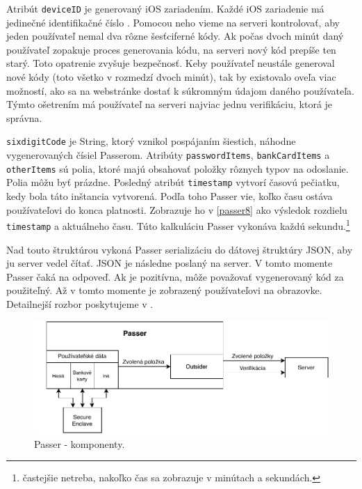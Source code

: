 Atribút \texttt{deviceID} je generovaný iOS zariadením. Každé iOS zariadenie má jedinečné identifikačné číslo \cite{iOS_id}. Pomocou neho vieme na serveri kontrolovať, aby jeden používateľ nemal dva rôzne šesťciferné kódy. Ak počas dvoch minút daný používateľ zopakuje proces generovania kódu, na serveri nový kód prepíše ten starý. Toto opatrenie zvyšuje bezpečnosť. Keby používateľ neustále generoval nové kódy (toto všetko v rozmedzí dvoch minút), tak by existovalo oveľa viac možností, ako sa na webstránke dostať k súkromným údajom daného používateľa. Týmto ošetrením má používateľ na serveri najviac jednu verifikáciu, ktorá je správna.

\texttt{sixdigitCode} je String, ktorý vznikol pospájaním šiestich, náhodne vygenerovaných čísiel Passerom. Atribúty \texttt{passwordItems}, \texttt{bankCardItems} a \texttt{otherItems} sú polia, ktoré majú obsahovať položky rôznych typov na odoslanie. Polia môžu byť prázdne. Posledný atribút \texttt{timestamp} vytvorí časovú pečiatku, kedy bola táto inštancia vytvorená. Podľa toho Passer vie, koľko času ostáva používateľovi do konca platnosti. Zobrazuje ho v \figurename{ \ref{passer8}} ako výsledok rozdielu \texttt{timestamp} a aktuálneho času. Túto kalkuláciu Passer vykonáva každú sekundu.\footnote{častejšie netreba, nakoľko čas sa zobrazuje v minútach a sekundách.}

Nad touto štruktúrou vykoná Passer serializáciu do dátovej štruktúry JSON, aby ju server vedel čítať. JSON je následne poslaný na server. V tomto momente Passer čaká na odpoveď. Ak je pozitívna, môže považovať vygenerovaný kód za použiteľný. Až v tomto momente je zobrazený používateľovi na obrazovke. Detailnejší rozbor poskytujeme v .
\newline
\begin{figure}[H]
  \centering
  \includegraphics[width=15cm]{img/passercomponents.pdf}
  \caption{Passer - komponenty.}
  \label{passercomponents}
\end{figure}